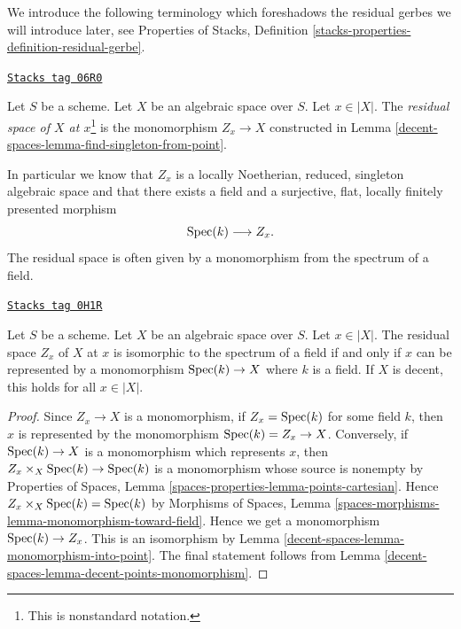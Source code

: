 We introduce the following terminology which foreshadows
the residual gerbes we will introduce later, see
Properties of Stacks, Definition
\ref{stacks-properties-definition-residual-gerbe}.

\begin{definition}
\label{decent-spaces-definition-residual-space}
\href{https://stacks.math.columbia.edu/tag/06R0}{\texttt{Stacks tag 06R0}}

Let $S$ be a scheme.
Let $X$ be an algebraic space over $S$. Let $x \in |X|$.
The
{\it residual space of $X$ at $x$}\footnote{This is nonstandard notation.}
is the monomorphism $Z_x \to X$ constructed in
Lemma \ref{decent-spaces-lemma-find-singleton-from-point}.
\end{definition}

In particular we know that $Z_x$ is a
locally Noetherian, reduced, singleton algebraic space
and that there exists a field and a surjective, flat, locally
finitely presented morphism
$$
\operatorname{Spec}(k) \longrightarrow Z_x.
$$
The residual space is often given by a monomorphism
from the spectrum of a field.

\begin{lemma}
\label{decent-spaces-lemma-residual-space-monomorphism}
\href{https://stacks.math.columbia.edu/tag/0H1R}{\texttt{Stacks tag 0H1R}}

Let $S$ be a scheme. Let $X$ be an algebraic space over $S$. Let $x \in |X|$.
The residual space $Z_x$ of $X$ at $x$ is isomorphic to the spectrum of a field
if and only if $x$ can be represented by a monomorphism $\operatorname{Spec}(k) \to X$
where $k$ is a field. If $X$ is decent, this holds for all $x \in |X|$.
\end{lemma}

\begin{proof}
Since $Z_x \to X$ is a monomorphism, if $Z_x = \operatorname{Spec}(k)$ for some field $k$,
then $x$ is represented by the monomorphism $\operatorname{Spec}(k) = Z_x \to X$.
Conversely, if $\operatorname{Spec}(k) \to X$ is a monomorphism which represents $x$,
then $Z_x \times_X \operatorname{Spec}(k) \to \operatorname{Spec}(k)$ is a monomorphism whose source
is nonempty by Properties of Spaces, Lemma
\ref{spaces-properties-lemma-points-cartesian}.
Hence $Z_x \times_X \operatorname{Spec}(k) = \operatorname{Spec}(k)$ by Morphisms of Spaces, Lemma
\ref{spaces-morphisms-lemma-monomorphism-toward-field}.
Hence we get a monomorphism $\operatorname{Spec}(k) \to Z_x$. This is
an isomorphism by Lemma \ref{decent-spaces-lemma-monomorphism-into-point}.
The final statement follows from Lemma \ref{decent-spaces-lemma-decent-points-monomorphism}.
\end{proof}

